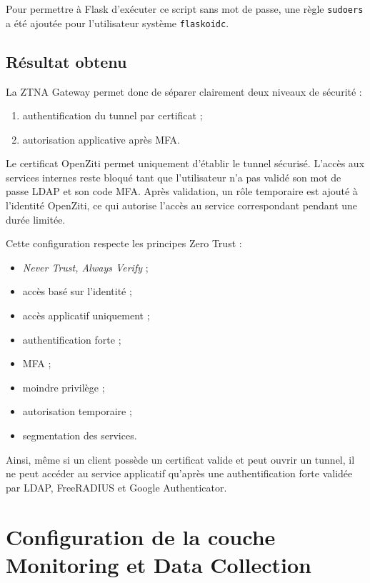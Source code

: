 \documentclass[12pt,a4paper,oneside]{report}
\begin{document}
	Pour permettre à Flask d'exécuter ce script sans mot de passe, une règle \texttt{sudoers} a été ajoutée pour l'utilisateur système \texttt{flaskoidc}.
	
	\subsection{Résultat obtenu}
	
	La ZTNA Gateway permet donc de séparer clairement deux niveaux de sécurité :
	
	\begin{enumerate}
		\item authentification du tunnel par certificat ;
		\item autorisation applicative après MFA.
	\end{enumerate}
	
	Le certificat OpenZiti permet uniquement d'établir le tunnel sécurisé. L'accès aux services internes reste bloqué tant que l'utilisateur n'a pas validé son mot de passe LDAP et son code MFA. Après validation, un rôle temporaire est ajouté à l'identité OpenZiti, ce qui autorise l'accès au service correspondant pendant une durée limitée.
	
	Cette configuration respecte les principes Zero Trust :
	
	\begin{itemize}
		\item \textit{Never Trust, Always Verify} ;
		\item accès basé sur l'identité ;
		\item accès applicatif uniquement ;
		\item authentification forte ;
		\item MFA ;
		\item moindre privilège ;
		\item autorisation temporaire ;
		\item segmentation des services.
	\end{itemize}
	
	Ainsi, même si un client possède un certificat valide et peut ouvrir un tunnel, il ne peut accéder au service applicatif qu'après une authentification forte validée par LDAP, FreeRADIUS et Google Authenticator.

	\section{Configuration de la couche Monitoring et Data Collection}
	
\end{document}
